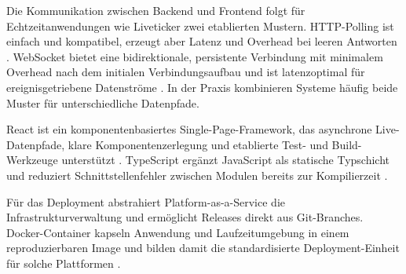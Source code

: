 Die Kommunikation zwischen Backend und Frontend folgt für Echtzeitanwendungen wie Liveticker zwei etablierten Mustern. HTTP-Polling ist einfach und kompatibel, erzeugt aber Latenz und Overhead bei leeren Antworten \cite{delatorre2019}. WebSocket bietet eine bidirektionale, persistente Verbindung mit minimalem Overhead nach dem initialen Verbindungsaufbau und ist latenzoptimal für ereignisgetriebene Datenströme \cite{rfc6455, delatorre2019}. In der Praxis kombinieren Systeme häufig beide Muster für unterschiedliche Datenpfade.

React ist ein komponentenbasiertes Single-Page-Framework, das asynchrone Live-Datenpfade, klare Komponentenzerlegung und etablierte Test- und Build-Werkzeuge unterstützt \cite{react}. TypeScript ergänzt JavaScript als statische Typschicht und reduziert Schnittstellenfehler zwischen Modulen bereits zur Kompilierzeit \cite{typescript}.

Für das Deployment abstrahiert Platform-as-a-Service die Infrastrukturverwaltung und ermöglicht Releases direkt aus Git-Branches. Docker-Container kapseln Anwendung und Laufzeitumgebung in einem reproduzierbaren Image und bilden damit die standardisierte Deployment-Einheit für solche Plattformen \cite{merkel2014}.

